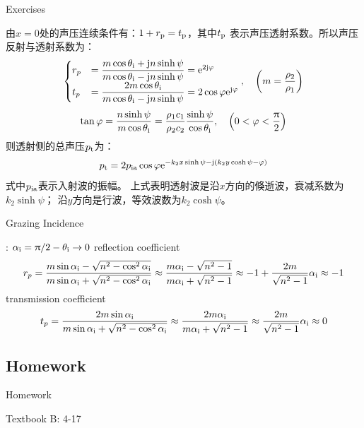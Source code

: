\documentclass[9pt,mathserif]{beamer}
\let\emph\relax %
\begin{document}
\begin{frame}{Exercises}
	\begin{outline}
		\1 由$x=0$处的声压连续条件有：$1+r_\text{p}=t_\text{p}$，其中$t_\text{p}$
		表示声压透射系数。所以声压反射与透射系数为：
		$$
			\begin{cases}
				r_p & = \dfrac{m\cos \theta \st{i} +
			\mj n \sinh \psi }{m\cos \theta\st{i} - \mj n \sinh \psi} = 
			\me^{2\mj \phi}\\
			t_p& = \dfrac{2m\cos \theta \st{i}}{m\cos 
				\theta\st{i} - \mj n \sinh \psi} = 2\cos\phi \me^{\mj \phi}
			\end{cases}
			\qc \qty(m = \frac{\rho_2}{\rho_1})		
		$$
		$$
		\tan \phi = \frac{n\sinh \psi}{m \cos \theta\st{i}} = 
		\frac{\rho_1c_1}{\rho_2c_2} \frac{\sinh \psi}{\cos \theta\st{i}}
		\qc \qty(0<\phi<\frac{\uppi}{2})$$
		\1 则透射侧的总声压$p_\text{t}$为：
		$$		p_\text{t} = 2p_\text{ia} \cos \varphi \mathrm{e}^{-k_2x\sinh \psi - \mathrm{j} (k_2 y
		\cosh \psi -\varphi)}$$
		\1 式中$p_\text{ia}$表示入射波的振幅。
		上式表明透射波是沿$x$方向的倏逝波，衰减系数为$k_2 \sinh \psi$；
		沿$y$方向是行波，等效波数为$k_2\cosh \psi$。
	\end{outline}
\end{frame}

\begin{frame}{Grazing Incidence}
	\begin{outline}
		\1 \emph{grazing angle}: $\alpha_\text{i} = \uppi/2 - \theta_\text{i} \to 0$
		\1 reflection coefficient
		$$
		r_p = \frac{m\sin \alpha_\text{i}-\sqrt{n^2-\cos^2\alpha_\text{i}}}{
		m\sin \alpha_\text{i}+\sqrt{n^2-\cos^2\alpha_\text{i}}}
		\approx
		\frac{m\alpha_\text{i}-\sqrt{n^2-1}}{m\alpha_\text{i}+\sqrt{n^2-1}}
		\approx -1 +\frac{2m}{\sqrt{n^2-1}} \alpha_\text{i}\approx -1
		$$
		\1 transmission coefficient
		$$
		t_p = \frac{2m\sin \alpha_\text{i}}{
		m\sin \alpha_\text{i}+\sqrt{n^2-\cos^2\alpha_\text{i}}}
		\approx
		\frac{2m\alpha_\text{i}}{m\alpha_\text{i}+\sqrt{n^2-1}}
		\approx \frac{2m}{\sqrt{n^2-1}} \alpha_\text{i}\approx 0
		$$
	\end{outline}
\end{frame}

\subsection{Homework}
\begin{frame}{Homework}
	\begin{outline}[enumerate]
		\1 Textbook B: 4-17
	\end{outline}
\end{frame}
\end{document}
